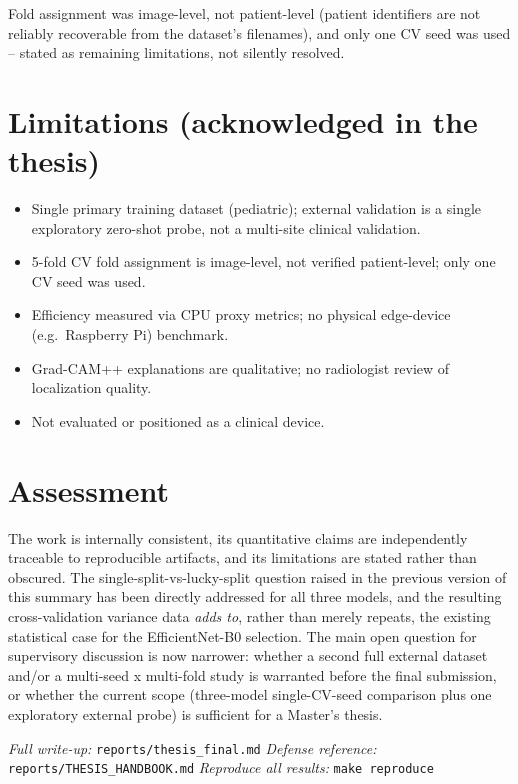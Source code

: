 \documentclass[11pt]{article}
\begin{document}
Fold assignment was image-level, not patient-level (patient identifiers are
not reliably recoverable from the dataset's filenames), and only one CV
seed was used -- stated as remaining limitations, not silently resolved.

\section*{Limitations (acknowledged in the thesis)}
\begin{itemize}[leftmargin=1.4em]
  \item Single primary training dataset (pediatric); external validation is
        a single exploratory zero-shot probe, not a multi-site clinical
        validation.
  \item 5-fold CV fold assignment is image-level, not verified
        patient-level; only one CV seed was used.
  \item Efficiency measured via CPU proxy metrics; no physical edge-device
        (e.g.\ Raspberry Pi) benchmark.
  \item Grad-CAM++ explanations are qualitative; no radiologist review of
        localization quality.
  \item Not evaluated or positioned as a clinical device.
\end{itemize}

\section*{Assessment}
The work is internally consistent, its quantitative claims are independently
traceable to reproducible artifacts, and its limitations are stated rather
than obscured. The single-split-vs-lucky-split question raised in the
previous version of this summary has been directly addressed for all three
models, and the resulting cross-validation variance data \emph{adds to},
rather than merely repeats, the existing statistical case for the
EfficientNet-B0 selection. The main open question for supervisory discussion
is now narrower: whether a second full external dataset and/or a
multi-seed x multi-fold study is warranted before the final submission, or
whether the current scope (three-model single-CV-seed comparison plus one
exploratory external probe) is sufficient for a Master's thesis.

\vspace{1em}
\noindent\textit{Full write-up:} \texttt{reports/thesis\_final.md} \quad
\textit{Defense reference:} \texttt{reports/THESIS\_HANDBOOK.md} \quad
\textit{Reproduce all results:} \texttt{make reproduce}
\end{document}
